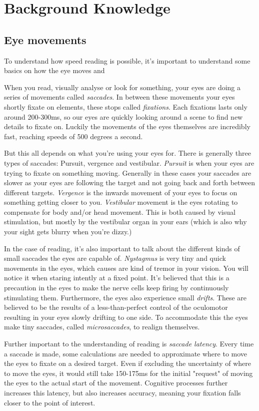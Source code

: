 \section{Background Knowledge}

\subsection{Eye movements}
To understand how speed reading is possible, it's important to understand some basics on how the eye moves and

When you read, visually analyse or look for something, your eyes are doing a series of movements called \textit{saccades}. In between these movements your eyes shortly fixate on elements, these stops called \textit{fixations}. Each fixations lasts only around 200-300ms, so our eyes are quickly looking around a scene to find new details to fixate on. Luckily the movements of the eyes themselves are incredibly fast, reaching speeds of 500 degrees a second.

But this all depends on what you're using your eyes for. There is generally three types of saccades:
Pursuit, vergence and vestibular.
\textit{Pursuit} is when your eyes are trying to fixate on something moving. Generally in these cases your saccades are slower as your eyes are following the target and not going back and forth between different targets.
\textit{Vergence} is the inwards movement of your eyes to focus on something getting closer to you.
\textit{Vestibular} movement is the eyes rotating to compensate for body and/or head movement. This is both caused by visual stimulation, but mostly by the vestibular organ in your ears (which is also why your sight gets blurry when you're dizzy.)

In the case of reading, it's also important to talk about the different kinds of small saccades the eyes are capable of. \textit{Nystagmus} is very tiny and quick movements in the eyes, which causes are kind of tremor in your vision. You will notice it when staring intently at a fixed point. It's believed that this is a precaution in the eyes to make the nerve cells keep firing by continuously stimulating them. Furthermore, the eyes also experience small \textit{drifts}. These are believed to be the results of a less-than-perfect control of the oculomotor resulting in your eyes slowly drifting to one side. To accommodate this the eyes make tiny saccades, called \textit{microsaccades}, to realign themselves.

Further important to the understanding of reading is \textit{saccade latency}. Every time a saccade is made, some calculations are needed to approximate where to move the eyes to fixate on a desired target. Even if excluding the uncertainty of where to move the eyes, it would still take 150-175ms for the initial "request" of moving the eyes to the actual start of the movement. Cognitive processes further increases this latency, but also increases accuracy, meaning your fixation falls closer to the point of interest.

